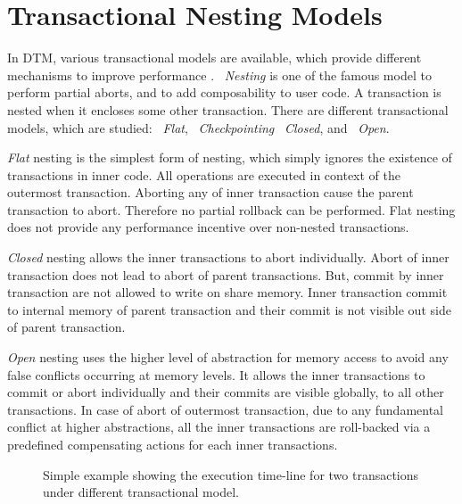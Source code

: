 \documentclass[12pt,english]{report}
\begin{document}
\section{Transactional Nesting Models}

In DTM, various transactional models are available, which provide different mechanisms to improve performance . ~\emph{Nesting} is one of the famous model to perform partial aborts, and to add composability to user code. A transaction is nested when it encloses some other transaction. There are different transactional  models, which are studied: ~\emph{Flat}, ~\emph{Checkpointing} ~\emph{Closed}, and ~\emph{Open}. 

\textit{Flat} nesting is the simplest form of nesting, which simply ignores the existence of transactions in inner code. All operations are executed in context of the outermost transaction. Aborting any of inner transaction cause the parent transaction to abort. Therefore no partial rollback can be performed. Flat nesting does not provide any performance incentive over non-nested transactions.

\textit{Closed} nesting allows the inner transactions to abort individually. Abort of inner transaction does not lead to abort of parent transactions. But, commit by inner transaction are not allowed to write on share memory. Inner transaction commit to internal memory of parent transaction and their commit is not visible out side of parent transaction.

\textit{Open} nesting uses the higher level of abstraction for memory access to avoid any false conflicts occurring at memory levels. It allows the inner transactions to commit or abort individually and their commits are visible globally, to all other transactions. In case of abort of outermost transaction, due to any fundamental conflict at higher abstractions, all the inner transactions are roll-backed via a predefined compensating actions for each inner transactions.

\begin{figure}
\caption{Simple example showing the execution time-line for two transactions under different transactional model.}
\label{Fig:Nesting_example}
\end{figure}
\end{document}

